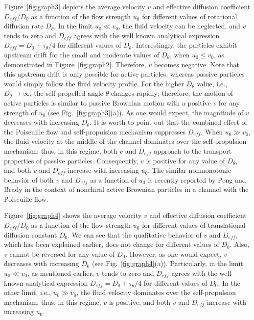 \documentclass[aps,pre,preprint,superscriptaddress,amsmath,amssymb,nofootinbib]{revtex4}
\begin{document}
Figure~\ref{fig:graph3} depicts the average velocity $v$ and effective diffusion coefficient $D_{eff}/D_0$ as a function of the flow strength $u_0$ for different values of rotational diffusion rate $D_\theta$.
In the limit $u_0 \ll v_0$, the fluid velocity can be neglected, and $v$ tends to zero and $D_{eff}$ agrees with the well known analytical expression $D_{eff} = D_0 + \tau_\theta/4$ \cite{Howse_PRL} for different values of $D_\theta$.
Interestingly, the particles exhibit upstream drift for the small and moderate values of $D_\theta$, when $u_0 \le v_0$, as demonstrated in Figure~\ref{fig:graph2}.
Therefore, $v$ becomes negative.
Note that this upstream drift is only possible for active particles, whereas passive particles would simply follow the fluid velocity profile. 
For the higher $D_\theta$ value, i.e., $D_\theta \rightarrow \infty$, the self-propelled angle $\theta$ changes rapidly; therefore, the motion of active particles is similar to passive Brownian motion with a positive $v$ for any strength of $u_0$ (see Fig.~\ref{fig:graph3}(a)). 
As one would expect, the magnitude of $v$ decreases with increasing $D_\theta$. 
It is worth to point out that the combined effect of the Poiseuille flow and self-propulsion mechanism suppresses $D_{eff}$. 
When $u_0 \gg v_0$, the fluid velocity at the middle of the channel dominates over the self-propulsion mechanism; thus, in this regime, both $v$ and $D_{eff}$ approach to the transport properties of passive particles. 
Consequently, $v$ is positive for any value of $D_\theta$, and both $v$ and $D_{eff}$ increase with increasing $u_0$.
The similar nonmonotonic behavior of both $v$ and $D_{eff}$ as a function of $u_0$ is recently reported by Peng and Brady \cite{Peng_PRF} in the context of nonchiral active Brownian particles in a channel with the Poiseuille flow. 

Figure~\ref{fig:graph4} shows the average velocity $v$ and effective diffusion coefficient $D_{eff}/D_0$ as a function of the flow strength $u_0$ for different values of translational diffusion constant $D_0$.
We can see that the qualitative behavior of $v$ and $D_{eff}$, which has been explained earlier, does not change for different values of $D_0$. 
Also, $v$ cannot be reversed for any value of $D_0$. 
However, as one would expect, $v$ decreases with increasing $D_0$ (see Fig.~\ref{fig:graph4}(a)).
Particularly, in the limit $u_0 \ll v_0$, as mentioned earlier, $v$ tends to zero and $D_{eff}$ agrees with the well known analytical expression $D_{eff} = D_0 + \tau_\theta/4$ for different values of $D_0$.
In the other limit, i.e., $u_0 \gg v_0$, the fluid velocity dominates over the self-propulsion mechanism; thus, in this regime, $v$ is positive, and both $v$ and $D_{eff}$ increase with increasing $u_0$.
\end{document}
